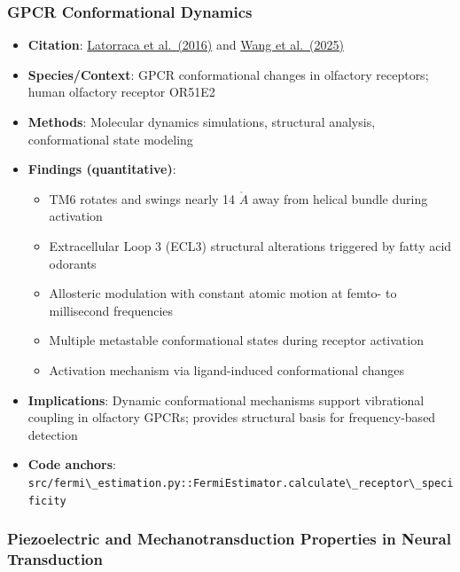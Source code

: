 \documentclass[
  13pt,
  a4paperpaper,
  12pt]{article}
\newcommand{\passthrough}[1]{#1}
\providecommand{\tightlist}{%
  \setlength{\itemsep}{0pt}\setlength{\parskip}{0pt}}
\begin{document}
\subsubsection{GPCR Conformational
Dynamics}\label{gpcr-conformational-dynamics-1}

\begin{itemize}
\tightlist
\item
  \textbf{Citation}:
  \href{https://pubs.acs.org/doi/10.1021/acs.chemrev.6b00177}{Latorraca
  et al.~(2016)} and
  \href{https://pmc.ncbi.nlm.nih.gov/articles/PMC11751049/}{Wang et
  al.~(2025)}
\item
  \textbf{Species/Context}: GPCR conformational changes in olfactory
  receptors; human olfactory receptor OR51E2
\item
  \textbf{Methods}: Molecular dynamics simulations, structural analysis,
  conformational state modeling
\item
  \textbf{Findings (quantitative)}:

  \begin{itemize}
  \tightlist
  \item
    TM6 rotates and swings nearly 14 \(\mathring{A}\) away from helical
    bundle during activation
  \item
    Extracellular Loop 3 (ECL3) structural alterations triggered by
    fatty acid odorants
  \item
    Allosteric modulation with constant atomic motion at femto- to
    millisecond frequencies
  \item
    Multiple metastable conformational states during receptor activation
  \item
    Activation mechanism via ligand-induced conformational changes
  \end{itemize}
\item
  \textbf{Implications}: Dynamic conformational mechanisms support
  vibrational coupling in olfactory GPCRs; provides structural basis for
  frequency-based detection
\item
  \textbf{Code anchors}:
  \passthrough{\lstinline!src/fermi\_estimation.py::FermiEstimator.calculate\_receptor\_specificity!}
\end{itemize}

\subsubsection{Piezoelectric and Mechanotransduction Properties in
Neural
Transduction}\label{piezoelectric-and-mechanotransduction-properties-in-neural-transduction}
\end{document}
